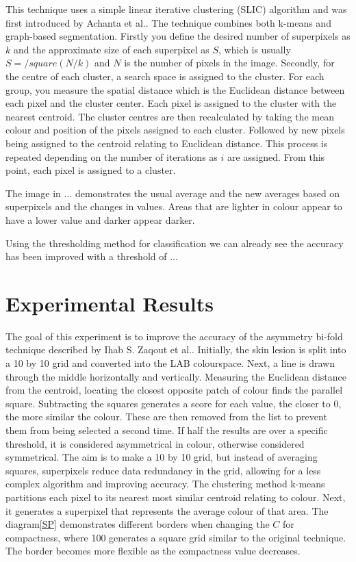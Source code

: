 This technique uses a simple linear iterative clustering (SLIC) algorithm and was first introduced by Achanta et al.\cite{Achanta2012}. The technique combines both k-means and graph-based segmentation. Firstly you define the desired number of superpixels as $k$ and the approximate size of each superpixel as $S$, which is usually $S = /square(N/k)$ and $N$ is the number of pixels in the image. Secondly, for the centre of each cluster, a search space is assigned to the cluster. For each group, you measure the spatial distance which is the Euclidean distance between each pixel and the cluster center. Each pixel is assigned to the cluster with the nearest centroid. The cluster centres are then recalculated by taking the mean colour and position of the pixels assigned to each cluster. Followed by new pixels being assigned to the centroid relating to Euclidean distance. This process is repeated depending on the number of iterations as $i$ are assigned. From this point, each pixel is assigned to a cluster.

The image in ... demonstrates the usual average and the new averages based on superpixels and the changes in values. Areas that are lighter in colour appear to have a lower value and darker appear darker.

Using the thresholding method for classification we can already see the accuracy has been improved with a threshold of ...

\section{Experimental Results}
The goal of this experiment is to improve the accuracy of the asymmetry bi-fold technique described by Ihab S. Zaqout et al.\cite{Zaqout2016}. Initially, the skin lesion is split into a 10 by 10 grid and converted into the LAB colourspace. Next, a line is drawn through the middle horizontally and vertically. Measuring the Euclidean distance from the centroid, locating the closest opposite patch of colour finds the parallel square. Subtracting the squares generates a score for each value, the closer to 0, the more similar the colour. These are then removed from the list to prevent them from being selected a second time. If half the results are over a specific threshold, it is considered asymmetrical in colour, otherwise considered symmetrical. The aim is to make a 10 by 10 grid, but instead of averaging squares, superpixels reduce data redundancy in the grid, allowing for a less complex algorithm and improving accuracy. The clustering method k-means partitions each pixel to its nearest most similar centroid relating to colour. Next, it generates a superpixel that represents the average colour of that area. The diagram\ref{SP} demonstrates different borders when changing the $C$ for compactness, where 100 generates a square grid similar to the original technique. The border becomes more flexible as the compactness value decreases.

